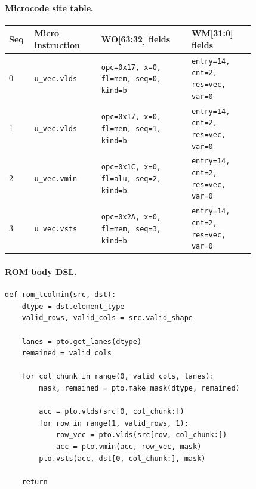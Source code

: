 \paragraph{Microcode site table.}
{\scriptsize
\begin{longtable}{@{}R{0.055\linewidth}L{0.23\linewidth}L{0.31\linewidth}L{0.22\linewidth}@{}}
\toprule
Seq & Micro instruction & WO[63:32] fields & WM[31:0] fields \\
 & \texttt{u\_vec.vlds} & \texttt{opc=0x17, x=0, fl=mem, seq=0, kind=b} & \texttt{entry=14, cnt=2, res=vec, var=0} \\
1 & \texttt{u\_vec.vlds} & \texttt{opc=0x17, x=0, fl=mem, seq=1, kind=b} & \texttt{entry=14, cnt=2, res=vec, var=0} \\
2 & \texttt{u\_vec.vmin} & \texttt{opc=0x1C, x=0, fl=alu, seq=2, kind=b} & \texttt{entry=14, cnt=2, res=vec, var=0} \\
3 & \texttt{u\_vec.vsts} & \texttt{opc=0x2A, x=0, fl=mem, seq=3, kind=b} & \texttt{entry=14, cnt=2, res=vec, var=0} \\
\bottomrule
\end{longtable}
}
\paragraph{ROM body DSL.}
\begin{lstlisting}[style=ptocode]
def rom_tcolmin(src, dst):
    dtype = dst.element_type
    valid_rows, valid_cols = src.valid_shape

    lanes = pto.get_lanes(dtype)
    remained = valid_cols

    for col_chunk in range(0, valid_cols, lanes):
        mask, remained = pto.make_mask(dtype, remained)

        acc = pto.vlds(src[0, col_chunk:])
        for row in range(1, valid_rows, 1):
            row_vec = pto.vlds(src[row, col_chunk:])
            acc = pto.vmin(acc, row_vec, mask)
        pto.vsts(acc, dst[0, col_chunk:], mask)

    return
\end{lstlisting}
\Needspace{0.34\textheight}
